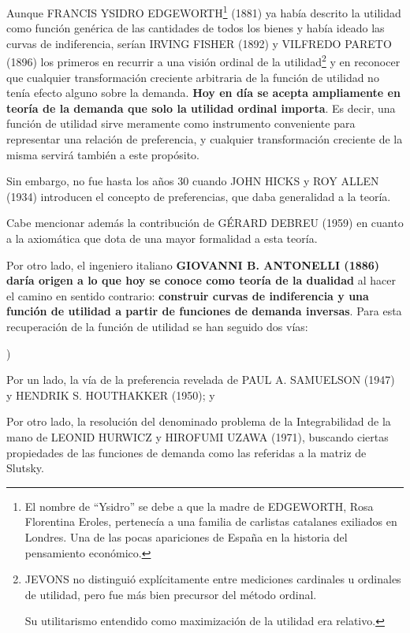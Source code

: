 \documentclass[10pt,a4paper]{article}
\newcounter{alphaitem}
\newenvironment{la}
      {\begin{list}{\alph{alphaitem})}{%
          \usecounter{alphaitem}%
          \setlength{\leftmargin}{1cm}%
          \setlength{\parskip}{3pt}%
          \setlength{\itemsep}{0pt}%
          \setlength{\parsep}{0pt}%
      }}
      {\end{list}}
\begin{document}
Aunque FRANCIS YSIDRO EDGEWORTH\footnote{%
    El nombre de ``Ysidro'' se debe a que la madre de EDGEWORTH, Rosa Florentina Eroles, pertenecía a una familia de carlistas catalanes exiliados en Londres. Una de las pocas apariciones de España en la historia del pensamiento económico.
} (1881) ya había descrito la utilidad como función genérica de las cantidades de todos los bienes y había ideado las curvas de indiferencia, serían IRVING FISHER (1892) y VILFREDO PARETO (1896) los primeros en recurrir a una visión ordinal de la utilidad\footnote{%
    JEVONS no distinguió explícitamente entre mediciones cardinales u ordinales de utilidad, pero fue más bien precursor del método ordinal.

    Su utilitarismo entendido como maximización de la utilidad era relativo.
} y en reconocer que cualquier transformación creciente arbitraria de la función de utilidad no tenía efecto alguno sobre la demanda. \textbf{Hoy en día se acepta ampliamente en teoría de la demanda que solo la utilidad ordinal importa}. Es decir, una función de utilidad sirve meramente como instrumento conveniente para representar una relación de preferencia, y cualquier transformación creciente de la misma servirá también a este propósito.

Sin embargo, no fue hasta los años 30 cuando JOHN HICKS y ROY ALLEN (1934) introducen el concepto de preferencias, que daba generalidad a la teoría.

Cabe mencionar además la contribución de GÉRARD DEBREU (1959) en cuanto a la axiomática que dota de una mayor formalidad a esta teoría.

Por otro lado, el ingeniero italiano \textbf{GIOVANNI B. ANTONELLI (1886) daría origen a lo que hoy se conoce como teoría de la dualidad} al hacer el camino en sentido contrario: \textbf{construir curvas de indiferencia y una función de utilidad a partir de funciones de demanda inversas}. Para esta recuperación de la función de utilidad se han seguido dos vías:

\begin{la}
    \item Por un lado, la vía de la preferencia revelada de PAUL A. SAMUELSON (1947) y HENDRIK S. HOUTHAKKER (1950); y
    \item Por otro lado, la resolución del denominado problema de la Integrabilidad de la mano de LEONID HURWICZ y HIROFUMI UZAWA (1971), buscando ciertas propiedades de las funciones de demanda como las referidas a la matriz de Slutsky.
\end{la}
\end{document}
